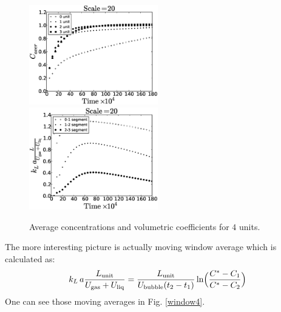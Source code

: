 \documentclass{article}
\newcommand{\beq}{\begin{equation}}
\newcommand{\feq}{\end{equation}}
\newcommand{\vol}{k_L\,a}
\newcommand{\lunit}{L_{\mathrm{unit}}}
\newcommand{\ububble}{U_{\mathrm{bubble}}}
\newcommand{\uliq}{U_{\mathrm{liq}}}
\newcommand{\ugas}{U_{\mathrm{gas}}}
\begin{document}
\begin{figure}[htb!]
\includegraphics[width=0.5\textwidth]{Figures/aver_units4scale20.eps}\hfill
\includegraphics[width=0.5\textwidth]{Figures/coeff_units4scale20.eps}\\
\caption{Average concentrations and volumetric coefficients for $4$ units.
\label{fig:unit:4}}
\end{figure}
The more interesting picture is actually moving window average which is calculated as:
\beq
\label{moving:average}
\vol\frac{\lunit}{\ugas+\uliq}=\frac{\lunit}{\ububble (t_2
-t_1)}\ln\Bigl(\frac{C^*-C_1}{C^*-C_2}\Bigr)
\feq
One can see those moving averages in Fig. \ref{window4}.
\end{document}
